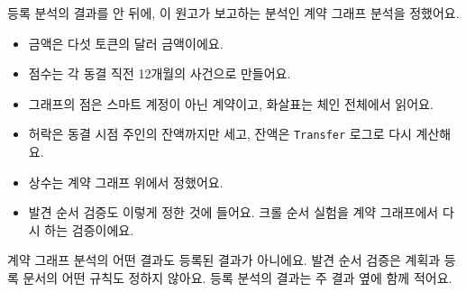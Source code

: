 등록 분석의 결과를 안 뒤에, 이 원고가 보고하는 분석인 계약 그래프 분석을 정했어요.
\begin{itemize}
\item 금액은 다섯 토큰의 달러 금액이에요.
\item 점수는 각 동결 직전 12개월의 사건으로 만들어요.
\item 그래프의 점은 스마트 계정이 아닌 계약이고, 화살표는 체인 전체에서 읽어요.
\item 허락은 동결 시점 주인의 잔액까지만 세고, 잔액은 \texttt{Transfer} 로그로 다시 계산해요.
\item 상수는 계약 그래프 위에서 정했어요.
\item 발견 순서 검증도 이렇게 정한 것에 들어요. 크롤 순서 실험을 계약 그래프에서 다시 하는 검증이에요.
\end{itemize}
계약 그래프 분석의 어떤 결과도 등록된 결과가 아니에요. 발견 순서 검증은 계획과 등록 문서의 어떤 규칙도 정하지 않아요. 등록 분석의 결과는 주 결과 옆에 함께 적어요.

